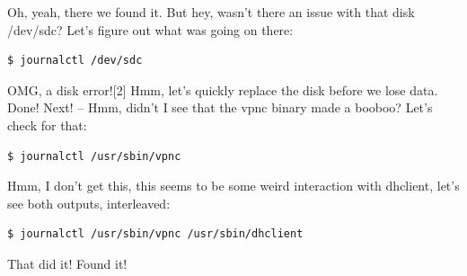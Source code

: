 \documentclass[titlepage]{article}
\begin{document}
Oh, yeah, there we found it. But hey, wasn't there an issue with that disk /dev/sdc? Let's figure out what was going on there:
\begin{lstlisting}
$ journalctl /dev/sdc
\end{lstlisting}
OMG, a disk error![2] Hmm, let's quickly replace the disk before we lose data. Done! Next! -- Hmm, didn't I see that the vpnc binary made a booboo? Let's check for that:
\begin{lstlisting}
$ journalctl /usr/sbin/vpnc
\end{lstlisting}
Hmm, I don't get this, this seems to be some weird interaction with dhclient, let's see both outputs, interleaved:
\begin{lstlisting}
$ journalctl /usr/sbin/vpnc /usr/sbin/dhclient
\end{lstlisting}
That did it! Found it!
\end{document}
